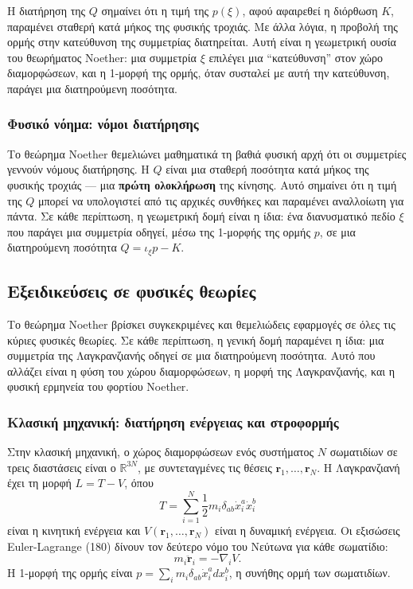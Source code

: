\documentclass[12pt]{article}
\begin{document}
Η διατήρηση της $Q$ σημαίνει ότι η τιμή της $p(\xi)$, αφού αφαιρεθεί η διόρθωση $K$, παραμένει σταθερή κατά μήκος της φυσικής τροχιάς. Με άλλα λόγια, η προβολή της ορμής στην κατεύθυνση της συμμετρίας διατηρείται. Αυτή είναι η γεωμετρική ουσία του θεωρήματος Noether: μια συμμετρία $\xi$ επιλέγει μια ``κατεύθυνση'' στον χώρο διαμορφώσεων, και η 1-μορφή της ορμής, όταν συσταλεί με αυτή την κατεύθυνση, παράγει μια διατηρούμενη ποσότητα.

\subsubsection{Φυσικό νόημα: νόμοι διατήρησης}

Το θεώρημα Noether θεμελιώνει μαθηματικά τη βαθιά φυσική αρχή ότι οι συμμετρίες γεννούν νόμους διατήρησης. Η $Q$ είναι μια σταθερή ποσότητα κατά μήκος της φυσικής τροχιάς — μια \textbf{πρώτη ολοκλήρωση} της κίνησης. Αυτό σημαίνει ότι η τιμή της $Q$ μπορεί να υπολογιστεί από τις αρχικές συνθήκες και παραμένει αναλλοίωτη για πάντα. Σε κάθε περίπτωση, η γεωμετρική δομή είναι η ίδια: ένα διανυσματικό πεδίο $\xi$ που παράγει μια συμμετρία οδηγεί, μέσω της 1-μορφής της ορμής $p$, σε μια διατηρούμενη ποσότητα $Q = \iota_\xi p - K$.

\subsection{Εξειδικεύσεις σε φυσικές θεωρίες}

Το θεώρημα Noether βρίσκει συγκεκριμένες και θεμελιώδεις εφαρμογές σε όλες τις κύριες φυσικές θεωρίες. Σε κάθε περίπτωση, η γενική δομή παραμένει η ίδια: μια συμμετρία της Λαγκρανζιανής οδηγεί σε μια διατηρούμενη ποσότητα. Αυτό που αλλάζει είναι η φύση του χώρου διαμορφώσεων, η μορφή της Λαγκρανζιανής, και η φυσική ερμηνεία του φορτίου Noether.

\subsubsection{Κλασική μηχανική: διατήρηση ενέργειας και στροφορμής}

Στην κλασική μηχανική, ο χώρος διαμορφώσεων ενός συστήματος $N$ σωματιδίων σε τρεις διαστάσεις είναι ο $\mathbb{R}^{3N}$, με συντεταγμένες τις θέσεις $\mathbf{r}_1, \dots, \mathbf{r}_N$. Η Λαγκρανζιανή έχει τη μορφή $L = T - V$, όπου
\[
T = \sum_{i=1}^N \frac{1}{2} m_i \delta_{ab} \dot{x}_i^a \dot{x}_i^b
\]
είναι η κινητική ενέργεια και $V(\mathbf{r}_1, \dots, \mathbf{r}_N)$ είναι η δυναμική ενέργεια. Οι εξισώσεις Euler-Lagrange (180) δίνουν τον δεύτερο νόμο του Νεύτωνα για κάθε σωματίδιο:
\[
m_i \ddot{\mathbf{r}}_i = -\nabla_i V.
\]
Η 1-μορφή της ορμής είναι $p = \sum_i m_i \delta_{ab} \dot{x}_i^a dx_i^b$, η συνήθης ορμή των σωματιδίων.
\end{document}
